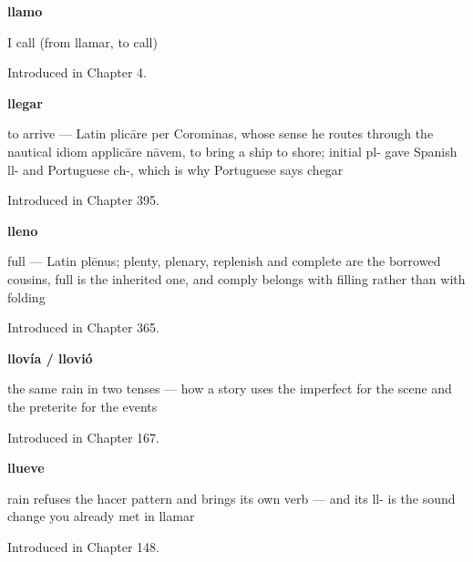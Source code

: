 \noindent\begin{minipage}[t]{\linewidth}
\raggedright
\textbf{llamo}\par
\small I call (from llamar, to call)\par
\footnotesize Introduced in Chapter 4.
\end{minipage}\par\medskip

\noindent\begin{minipage}[t]{\linewidth}
\raggedright
\textbf{llegar}\par
\small to arrive — Latin plicāre per Corominas, whose sense he routes through the nautical idiom applicāre nāvem, to bring a ship to shore; initial pl- gave Spanish ll- and Portuguese ch-, which is why Portuguese says chegar\par
\footnotesize Introduced in Chapter 395.
\end{minipage}\par\medskip

\noindent\begin{minipage}[t]{\linewidth}
\raggedright
\textbf{lleno}\par
\small full — Latin plēnus; plenty, plenary, replenish and complete are the borrowed cousins, full is the inherited one, and comply belongs with filling rather than with folding\par
\footnotesize Introduced in Chapter 365.
\end{minipage}\par\medskip

\noindent\begin{minipage}[t]{\linewidth}
\raggedright
\textbf{llovía / llovió}\par
\small the same rain in two tenses — how a story uses the imperfect for the scene and the preterite for the events\par
\footnotesize Introduced in Chapter 167.
\end{minipage}\par\medskip

\noindent\begin{minipage}[t]{\linewidth}
\raggedright
\textbf{llueve}\par
\small rain refuses the hacer pattern and brings its own verb — and its ll- is the sound change you already met in llamar\par
\footnotesize Introduced in Chapter 148.
\end{minipage}\par\medskip

